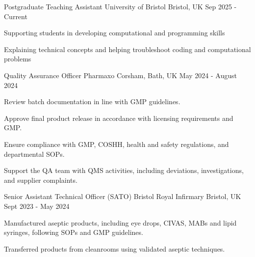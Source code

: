 \vspace{-4mm}
\begin{cventries}
\cventry
    {Postgraduate Teaching Assistant}
    {University of Bristol}
    {Bristol, UK}
    {Sep 2025 - Current}
    {
      \begin{cvitems}
        \item {Supporting students in developing computational and programming skills}
        \item{Explaining technical concepts and helping troubleshoot coding and computational problems}
      \end{cvitems}
    }
    
  \cventry
  {Quality Assurance Officer}
  {Pharmaxo}
  {Corsham, Bath, UK}
  {May 2024 - August 2024}
  {
    \begin{cvitems}
      \item{Review batch documentation in line with GMP guidelines.}
      \item{Approve final product release in accordance with licensing requirements and GMP.}
      \item{Ensure compliance with GMP, COSHH, health and safety regulations, and departmental SOPs.}
      \item{Support the QA team with QMS activities, including deviations, investigations, and supplier complaints.}
    \end{cvitems}
  }
  
  \cventry
  {Senior Assistant Technical Officer (SATO)}
  {Bristol Royal Infirmary}
  {Bristol, UK}
  {Sept 2023 - May 2024}
  {
    \begin{cvitems}
      \item {Manufactured aseptic products, including eye drops, CIVAS, MABs and lipid syringes, following SOPs and GMP guidelines.}
      \item {Transferred products from cleanrooms using validated aseptic techniques.}
    \end{cvitems}
  }
\end{cventries}
